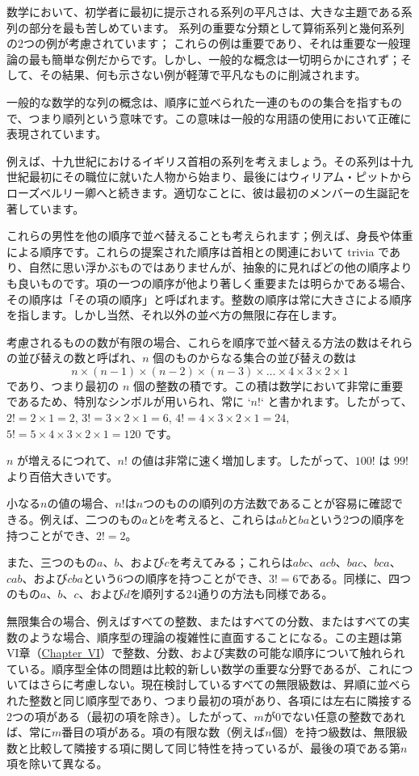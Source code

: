 \documentclass[a4paper,11pt,openany]{ltjsbook}
\providecommand{\ChapRef}[2][Chapter]{\hyperref[chapter:#2]{\Chg{#1}{Chapter}~#2}}
\providecommand{\Chg}[2]{#2}
\begin{document}
数学において、初学者に最初に提示される系列の平凡さは、大きな主題である系列の部分を最も苦しめています。
系列の重要な分類として算術系列と幾何系列の2つの例が考慮されています；
これらの例は重要であり、それは重要な一般理論の最も簡単な例だからです。しかし、一般的な概念は一切明らかにされず；そして、その結果、何も示さない例が軽薄で平凡なものに削減されます。

一般的な数学的な列の概念は、順序に並べられた一連のものの集合を指すもので、つまり順列という意味です。この意味は一般的な用語の使用において正確に表現されています。

例えば、十九世紀におけるイギリス首相の系列を考えましょう。その系列は十九世紀最初にその職位に就いた人物から始まり、最後にはウィリアム・ピットからローズベルリー卿へと続きます。適切なことに、彼は最初のメンバーの生誕記を著しています。

これらの男性を他の順序で並べ替えることも考えられます；例えば、身長や体重による順序です。これらの提案された順序は首相との関連において trivia であり、自然に思い浮かぶものではありませんが、抽象的に見ればどの他の順序よりも良いものです。項の一つの順序が他より著しく重要または明らかである場合、その順序は「その項の順序」と呼ばれます。整数の順序は常に大きさによる順序を指します。しかし当然、それ以外の並べ方の無限に存在します。

考慮されるものの数が有限の場合、これらを順序で並べ替える方法の数はそれらの並び替えの数と呼ばれ、$n$ 個のものからなる集合の並び替えの数は
\[
n × (n - 1) × (n - 2) × (n - 3) × \dots × 4 × 3 × 2 × 1
\]
であり、つまり最初の $n$ 個の整数の積です。この積は数学において非常に重要であるため、特別なシンボルが用いられ、常に `$n!$` と書かれます。したがって、$2! = 2 × 1 = 2$, $3! = 3 × 2 × 1 = 6$, $4! = 4 × 3 × 2 × 1 = 24$, $5! = 5 × 4 × 3 × 2 × 1 = 120$ です。

$n$ が増えるにつれて、$n!$ の値は非常に速く増加します。したがって、$100!$ は $99!$ より百倍大きいです。

小なる$n$の値の場合、$n!$は$n$つのものの順列の方法数であることが容易に確認できる。例えば、二つのもの$a$と$b$を考えると、これらは$ab$と$ba$という2つの順序を持つことができ、$2! = 2$。

また、三つのもの$a$、$b$、および$c$を考えてみる；これらは$abc$、$acb$、$bac$、$bca$、$cab$、および$cba$という6つの順序を持つことができ、$3! = 6$である。同様に、四つのもの$a$、$b$、$c$、および$d$を順列する24通りの方法も同様である。

無限集合の場合、例えばすべての整数、またはすべての分数、またはすべての実数のような場合、順序型の理論の複雑性に直面することになる。この主題は第VI章（\ChapRef{VI}）で整数、分数、および実数の可能な順序について触れられている。順序型全体の問題は比較的新しい数学の重要な分野であるが、これについてはさらに考慮しない。現在検討しているすべての無限級数は、昇順に並べられた整数と同じ順序型であり、つまり最初の項があり、各項には左右に隣接する2つの項がある（最初の項を除き）。したがって、$m$が0でない任意の整数であれば、常に$m$番目の項がある。項の有限な数（例えば$n$個）を持つ級数は、無限級数と比較して隣接する項に関して同じ特性を持っているが、最後の項である第$n$項を除いて異なる。
\end{document}

